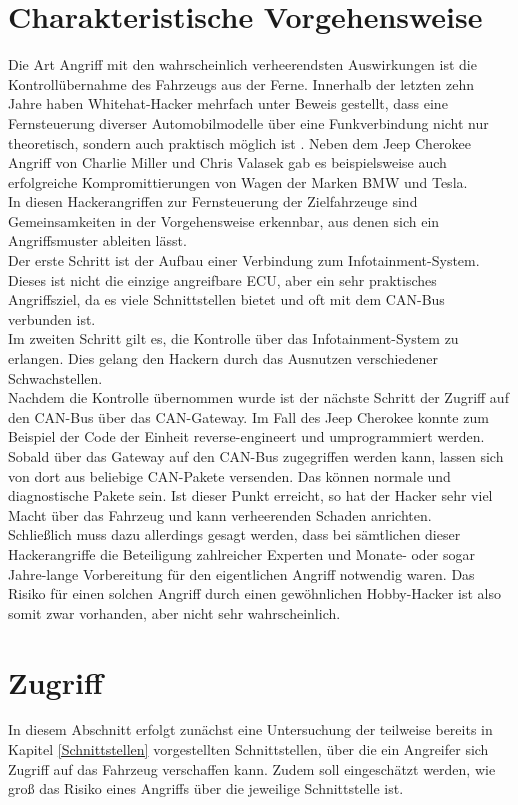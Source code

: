 \section{Charakteristische Vorgehensweise}
Die Art Angriff mit den wahrscheinlich verheerendsten Auswirkungen ist die Kontrollübernahme des Fahrzeugs aus der Ferne. Innerhalb der letzten zehn Jahre haben Whitehat-Hacker mehrfach unter Beweis gestellt, dass eine Fernsteuerung diverser Automobilmodelle über eine Funkverbindung nicht nur theoretisch, sondern auch praktisch möglich ist \cite[35]{Wurm.2022}. Neben dem Jeep Cherokee Angriff von Charlie Miller und Chris Valasek gab es beispielsweise auch erfolgreiche Kompromittierungen von Wagen der Marken BMW und Tesla.\\
In diesen Hackerangriffen zur Fernsteuerung der Zielfahrzeuge sind Gemeinsamkeiten in der Vorgehensweise erkennbar, aus denen sich ein Angriffsmuster ableiten lässt.\\
Der erste Schritt ist der Aufbau einer Verbindung zum Infotainment-System. Dieses ist nicht die einzige angreifbare \acs{ECU}, aber ein sehr praktisches Angriffsziel, da es viele Schnittstellen bietet und oft mit dem \acs{CAN}-Bus verbunden ist.\\
Im zweiten Schritt gilt es, die Kontrolle über das Infotainment-System zu erlangen. Dies gelang den Hackern durch das Ausnutzen verschiedener Schwachstellen.\\
Nachdem die Kontrolle übernommen wurde ist der nächste Schritt der Zugriff auf den \acs{CAN}-Bus über das \acs{CAN}-Gateway. Im Fall des Jeep Cherokee konnte zum Beispiel der Code der Einheit reverse-engineert und umprogrammiert werden.\\
Sobald über das Gateway auf den \acs{CAN}-Bus zugegriffen werden kann, lassen sich von dort aus beliebige \acs{CAN}-Pakete versenden. Das können normale und diagnostische Pakete sein. Ist dieser Punkt erreicht, so hat der Hacker sehr viel Macht über das Fahrzeug und kann verheerenden Schaden anrichten.\\
Schließlich muss dazu allerdings gesagt werden, dass bei sämtlichen dieser Hackerangriffe die Beteiligung zahlreicher Experten und Monate- oder sogar Jahre-lange Vorbereitung für den eigentlichen Angriff notwendig waren. Das Risiko für einen solchen Angriff durch einen gewöhnlichen Hobby-Hacker ist also somit zwar vorhanden, aber nicht sehr wahrscheinlich.


\section{Zugriff}
In diesem Abschnitt erfolgt zunächst eine Untersuchung der teilweise bereits in Kapitel \ref{Schnittstellen} vorgestellten Schnittstellen, über die ein Angreifer sich Zugriff auf das Fahrzeug verschaffen kann. Zudem soll eingeschätzt werden, wie groß das Risiko eines Angriffs über die jeweilige Schnittstelle ist.


